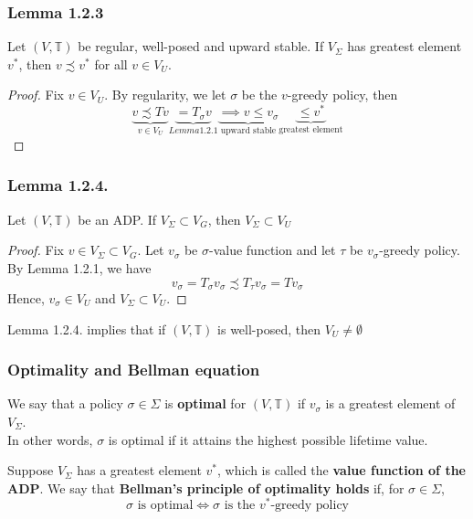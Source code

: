 \documentclass[11pt,xcolor={dvipsnames},hyperref={pdftex,pdfpagemode=UseNone,hidelinks,pdfdisplaydoctitle=true},usepdftitle=false]{beamer}
\begin{document}
\begin{frame}
\frametitle{Lemma 1.2.3}
\begin{lemma}
Let $(V,\mathbb{T})$ be regular, well-posed and upward stable. If $V_\Sigma$ has greatest element $v^*$, then $v\precsim v^*$ for all $v\in V_U$. 
\end{lemma}
\begin{proof}
Fix $v\in V_U$. By regularity, we let $\sigma$ be the $v$-greedy policy, then
$$
\underbrace{v\precsim Tv}_{v\in V_U}\underbrace{= T_\sigma v}_{Lemma 1.2.1}\underbrace{\implies v\le v_\sigma}_{\text{upward stable}} \underbrace{\le v^*}_{\text{greatest element}}
$$
\end{proof}
\end{frame}

\begin{frame}
\frametitle{Lemma 1.2.4.}
\begin{lemma}
Let $(V,\mathbb{T})$ be an ADP. If $V_\Sigma\subset V_G$, then $V_\Sigma\subset V_U$
\end{lemma}
\begin{proof}
Fix $v\in V_\Sigma\subset V_G$. Let $v_\sigma$ be $\sigma$-value function and let $\tau$ be $v_\sigma$-greedy policy. By Lemma 1.2.1, we have
$$
v_\sigma= T_\sigma v_\sigma\precsim T_\tau v_\sigma = Tv_\sigma
$$
Hence, $v_\sigma\in V_U$ and $V_\Sigma\subset V_U$.
\end{proof}
\begin{remark}
Lemma 1.2.4. implies that if $(V,\mathbb{T})$ is well-posed, then $V_U\neq \emptyset$
\end{remark}
\end{frame}


\begin{frame}
\frametitle{Optimality and Bellman equation}
\begin{definition}
We say that a policy $\sigma\in\Sigma$ is \textbf{optimal} for $(V,\mathbb{T})$ if $v_\sigma$ is a greatest element of $V_\Sigma$.\\
In other words, $\sigma$ is optimal if it attains the highest possible lifetime value.
\end{definition}
\begin{definition}
Suppose $V_\Sigma$ has a greatest element $v^*$, which is called the \textbf{value function of the ADP}. We say that \textbf{Bellman's principle of optimality holds} if, for $\sigma\in \Sigma$,
$$
\sigma \text{ is optimal} \iff \sigma\text{ is the $v^*$-greedy policy}
$$
\end{definition}
\end{frame}
\end{document}
